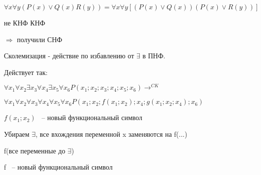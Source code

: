 \documentclass[russian]{lecture-notes}
\begin{document}
    \begin{example}

        $\forall x \forall y (P(x) \lor Q(x)R(y)) = \forall x \forall y [(P(x) \lor Q(x))(P(x) \lor R(y))]$

        \qquad \qquad \qquad \qquad не КНФ \qquad \qquad \qquad \qquad \qquad \qquad КНФ

        $\Rightarrow $ получили СНФ


        \end{example}

    \begin{definition}

        Сколемизация - действие по избавлению от $\exists$ в ПНФ.

        \end{definition}

    Действует так:

    $\forall x_{1} \forall x_{2} \exists x_{3} \forall x_{4} \exists x_{5} \forall x_{6} P(x_{1};x_{2};
    x_{3};x_{4};x_{5};x_{6}) \rightarrow^{CK}$

    $ \forall x_{1} \forall x_{2} \forall x_{3} \forall x_{4} \forall x_{5}
    \forall x_{6} P(x_{1};x_{2};f(x_{1};x_{2});x_{4};g(x_{1};x_{2};x_{4});x_{6})$

    $f(x_{1};x_{2})$ ~-- новый функциональный символ


    Убираем $\exists$, все вхождения переменной x заменяются на f(...)


    f(все переменные до $\exists$)

    f ~-- новый функциональный символ
\end{document}
